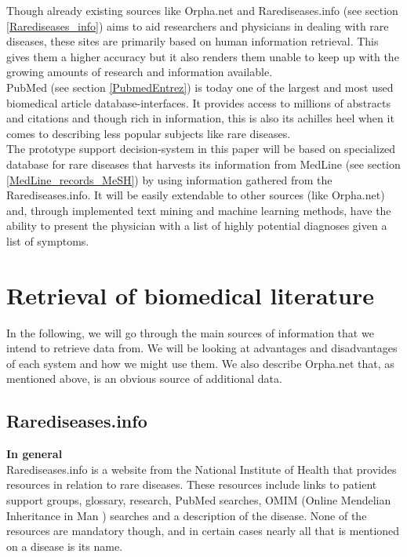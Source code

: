 Though already existing sources like Orpha.net and
Rarediseases.info (see section \ref{Rarediseases_info}) aims to aid researchers and
physicians in dealing with rare diseases, these sites are primarily
based on human information retrieval. This gives them a higher
accuracy but it also renders them unable to keep up with the growing
amounts of research and information available.\\

PubMed (see section \ref{PubmedEntrez}) is today one of the largest and most used
biomedical article database-interfaces. It provides access to millions
of abstracts and citations and though rich in information, this is
also its achilles heel when it comes to describing less popular
subjects like rare diseases.\\

The prototype support decision-system in this paper will be based on
specialized database for rare diseases that harvests its information
from MedLine (see section \ref{MedLine_records_MeSH}) by using information gathered from the
Rarediseases.info. It will be easily extendable to other sources (like
Orpha.net) and, through implemented text mining and machine learning
methods, have the ability to present the physician with a list of
highly potential diagnoses given a list of symptoms.

\section{Retrieval of biomedical literature}

In the following, we will go through the main sources of information
that we intend to retrieve data from. We will be looking at advantages
and disadvantages of each system and how we might use them. We also
describe Orpha.net that, as mentioned above, is an obvious source of
additional data.

\subsection{Rarediseases.info\label{Rarediseases_info}}

\textbf{In general} \\
Rarediseases.info is a website from the National Institute of Health
\cite{NIHOverview} that provides resources in relation to rare
diseases. These resources include links to patient support groups,
glossary, research, PubMed searches, OMIM (Online Mendelian
Inheritance in Man \cite{OMIM} )
searches and a description of the disease. None of the resources are
mandatory though, and in certain cases nearly all that is mentioned on
a disease is its name.\\

